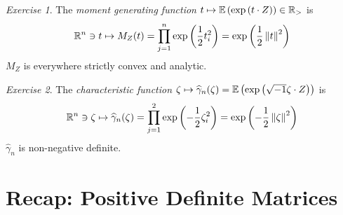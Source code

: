 \documentclass[12pt,a4paper]{amsart}
\theoremstyle{plain}%
\theoremstyle{definition}
\theoremstyle{remark}
\newtheorem{exercise}{Exercise}
\begin{document}
\begin{exercise} 
The \emph{moment generating function} $t \mapsto \operatorname{\mathbb E}\left(\exp\left(t\cdot Z\right)\right) \in \mathbb{R}_>$ is
%
\begin{equation*}
\mathbb{R}^n \ni t \mapsto M_Z(t) = \prod_{j=1}^n \exp\left(\frac12 t_i^2\right) = \exp\left(\frac12 \left\Vert t\right\Vert^2\right)
\end{equation*}
%
$M_Z$ is everywhere strictly convex and analytic.
\end{exercise}

\begin{exercise}
  The \emph{characteristic function} $\zeta \mapsto \widehat \gamma_n(\zeta) = \operatorname{\mathbb E}\left(\exp\left(\sqrt{-1} \zeta \cdot Z\right)\right)$ is
%
\begin{equation*}
  \mathbb{R}^n \ni \zeta \mapsto \widehat \gamma_n(\zeta) = \prod_{j=1}^2 \exp\left(-\frac12 \zeta_i^2\right) = \exp\left(-\frac12 \left\Vert\zeta\right\Vert ^2\right)
\end{equation*}
%
$\widehat \gamma_n$ is non-negative definite.
%
\end{exercise}

\section{Recap: Positive Definite Matrices}
\end{document}
